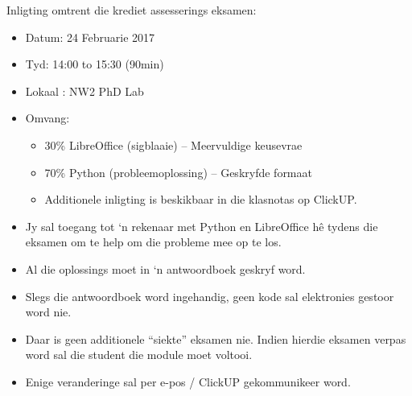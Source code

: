     \noindent
    Inligting omtrent die krediet assesserings eksamen:
    \begin{itemize}
        \item Datum: 24 Februarie 2017
        \item Tyd: 14:00 to 15:30 (90min)
        \item Lokaal : NW2 PhD Lab
        \item Omvang:
        \begin{itemize}
            \item 30\% LibreOffice (sigblaaie) -- Meervuldige keusevrae
            \item 70\% Python (probleemoplossing) -- Geskryfde formaat
            \item Additionele inligting is beskikbaar in die klasnotas op
                ClickUP.
        \end{itemize}
        \item Jy sal toegang tot `n rekenaar met Python en LibreOffice h\^e
            tydens die eksamen om te help om die probleme mee op te los.
        \item Al die oplossings moet in `n antwoordboek geskryf word.
        \item Slegs die antwoordboek word ingehandig, geen kode sal elektronies
            gestoor word nie.
        \item Daar is geen additionele ``siekte'' eksamen nie. Indien hierdie
            eksamen verpas word sal die student die module moet voltooi.
        \item Enige veranderinge sal per e-pos / ClickUP gekommunikeer word.
    \end{itemize}

